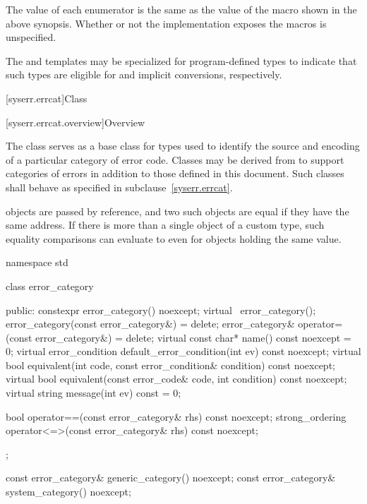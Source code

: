 \pnum
The value of each  enumerator is the same as
the value of the  macro shown in the above synopsis.
Whether or not the  implementation
exposes the  macros is unspecified.

\pnum
The  and  templates may be
specialized for program-defined types to indicate that such types are eligible
for  and  implicit
conversions, respectively.

[syserr.errcat]{Class }

[syserr.errcat.overview]{Overview}

\pnum
The class  serves as a base class for types used
to identify the source and encoding of a particular category of error code.
Classes may be derived from  to support
categories of errors in addition to those defined in this document.
Such classes shall behave as specified in subclause~\ref{syserr.errcat}.
\begin{note}
 objects are
passed by reference, and two such objects
are equal if they have the same address.
If there is more than a single object of a custom  type,
such equality comparisons can evaluate to 
even for objects holding the same value.
\end{note}

%
%
%
%
%
\begin{codeblock}
namespace std {
  class error_category {
  public:
    constexpr error_category() noexcept;
    virtual ~error_category();
    error_category(const error_category&) = delete;
    error_category& operator=(const error_category&) = delete;
    virtual const char* name() const noexcept = 0;
    virtual error_condition default_error_condition(int ev) const noexcept;
    virtual bool equivalent(int code, const error_condition& condition) const noexcept;
    virtual bool equivalent(const error_code& code, int condition) const noexcept;
    virtual string message(int ev) const = 0;

    bool operator==(const error_category& rhs) const noexcept;
    strong_ordering operator<=>(const error_category& rhs) const noexcept;
  };

  const error_category& generic_category() noexcept;
  const error_category& system_category() noexcept;
}
\end{codeblock}

